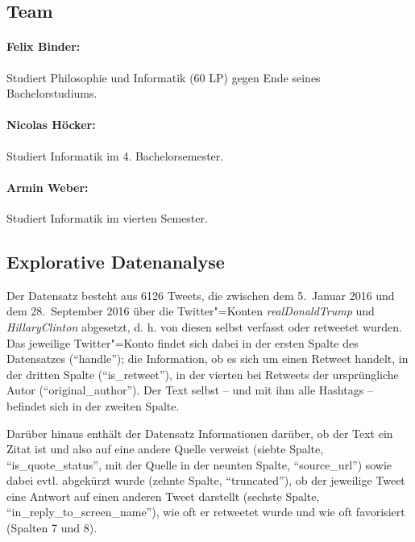 \documentclass[BCOR0mm,fontsize=12pt,paper=a4,final,numbers=noenddot]{scrartcl}
\begin{document}

\subsection{Team}

\paragraph*{Felix Binder:} Studiert Philosophie und Informatik (60 LP) gegen Ende seines Bachelorstudiums.

\paragraph*{Nicolas Höcker:} Studiert Informatik im 4. Bachelorsemester.

\paragraph*{Armin Weber:} Studiert Informatik im vierten Semester.


\subsection{Explorative Datenanalyse}

Der Datensatz besteht aus 6126 Tweets, die zwischen dem 5.~Januar 2016 und dem 28.~September 2016 über die Twitter"=Konten \textit{realDonaldTrump} und \textit{HillaryClinton} abgesetzt, d.\,\,h. von diesen selbst verfasst oder retweetet wurden. Das jeweilige Twitter"=Konto findet sich dabei in der ersten Spalte des Datensatzes ("`handle"'); die Information, ob es sich um einen Retweet handelt, in der dritten Spalte ("`is\_retweet"'), in der vierten bei Retweets der ursprüngliche Autor ("`original\_author"'). Der Text selbst -- und mit ihm alle Hashtags -- befindet sich in der zweiten Spalte.

Darüber hinaus enthält der Datensatz Informationen darüber, ob der Text ein Zitat ist und also auf eine andere Quelle verweist (siebte Spalte, "`is\_quote\_status"', mit der Quelle in der neunten Spalte, "`source\_url"') sowie dabei evtl. abgekürzt wurde (zehnte Spalte, "`truncated"'), ob der jeweilige Tweet eine Antwort auf einen anderen Tweet darstellt (sechste Spalte, "`in\_reply\_to\_screen\_name"'), wie oft er retweetet wurde und wie oft favorisiert (Spalten 7 und 8).
\end{document}
